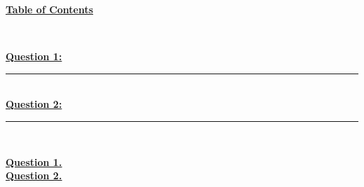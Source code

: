 \documentclass[12pt]{article}
\begin{document}
\begin{center}
	\hypertarget{toc}{\LARGE \underline{\textbf{Table of Contents}}}\\
\end{center}

\hyperlink{1}{\textbf{Question 1:}}
\vspace{1mm}
\hrule
\vspace{1mm} \leavevmode \\

\hyperlink{2}{\textbf{Question 2:}}
\vspace{1mm}
\hrule
\vspace{1mm} \leavevmode \\

\newpage

\hyperlink{toc}{\hypertarget{1}{\LARGE \underline{\textbf{Question 1.}}}}\\
\newpage
\hyperlink{toc}{\hypertarget{2}{\LARGE \underline{\textbf{Question 2.}}}}\\
\end{document}
